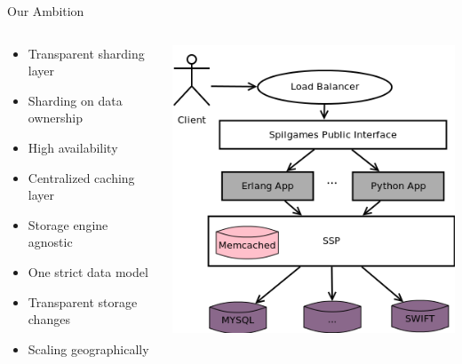 \documentclass[aspectratio=43]{beamer}
\begin{document}
\begin{frame}{Our Ambition}
    \begin{columns}
        \begin{column}[c]{0.5\textwidth}
            \begin{itemize}
                \item Transparent sharding layer
                \item Sharding on data ownership
                \item High availability
                \item Centralized caching layer
                \item Storage engine agnostic
                \item One strict data model
                \item Transparent storage changes
                \item Scaling geographically
            \end{itemize}
        \end{column}
        \begin{column}[c]{0.5\textwidth}
            \includegraphics[width=\textwidth]{images/newstorageusage.png}
        \end{column}
    \end{columns}
\end{frame}
\end{document}
